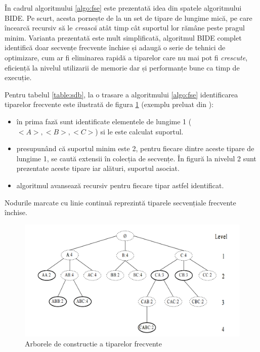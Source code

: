 În cadrul algoritmului \ref{algo:fse} este prezentată idea din spatele algoritmului BIDE. Pe scurt, acesta pornește de la un set de tipare de lungime mică, pe care încearcă recursiv să le \textit{crească} atât timp cât suportul lor rămâne peste pragul minim. Varianta prezentată este mult simplificată, algoritmul BIDE complet identifică doar secvențe frecvente închise și adaugă o serie de tehnici de optimizare, cum ar fi eliminarea rapidă a tiparelor care nu mai pot fi \textit{crescute}, eficiență la nivelul utilizarii de memorie dar și performanțe bune ca timp de execuție.

\begin{ex}
Pentru tabelul \ref{table:sdb}, la o trasare a algoritmului \ref{algo:fse} identificarea tiparelor frecvente este ilustrată de figura \ref{fig:bide-algo} (exemplu preluat din \cite{bib:wang2004bide}):
\begin{itemize}
\item în prima fază sunt identificate elementele de lungime 1 ($<A>,<B>,<C>$) si le este calculat suportul.
\item presupunând că suportul minim este 2, pentru fiecare dintre aceste tipare de lungime 1, se caută extensii în colecția de secvențe. În figură la nivelul 2 sunt prezentate aceste tipare iar alături, suportul asociat.
\item algoritmul avansează recursiv pentru fiecare tipar astfel identificat.

\end{itemize}
Nodurile marcate cu linie continuă reprezintă tiparele secvențiale frecvente închise. 
\end{ex}

\begin{figure}[h]
    \centering
    \includegraphics[width=\textwidth]{figures/bide-tree.png}
    \caption{Arborele de constructie a tiparelor frecvente}
    \label{fig:bide-algo}
\end{figure}

